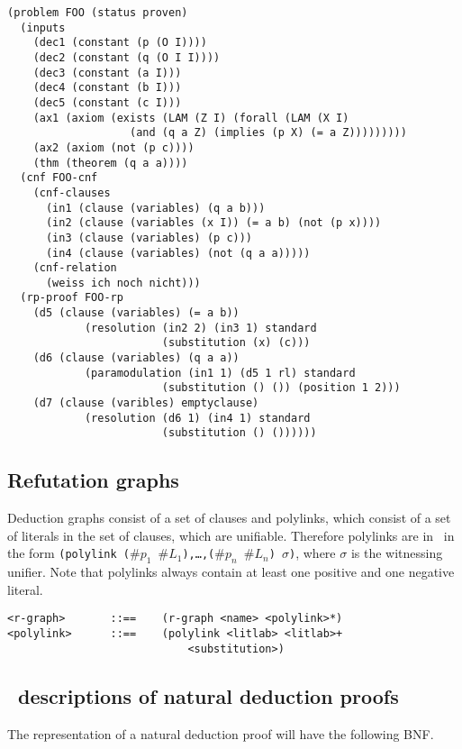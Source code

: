 \begin{verbatim}
(problem FOO (status proven)
  (inputs
    (dec1 (constant (p (O I))))
    (dec2 (constant (q (O I I)))) 
    (dec3 (constant (a I)))
    (dec4 (constant (b I)))
    (dec5 (constant (c I)))
    (ax1 (axiom (exists (LAM (Z I) (forall (LAM (X I) 
                   (and (q a Z) (implies (p X) (= a Z)))))))))
    (ax2 (axiom (not (p c))))
    (thm (theorem (q a a))))
  (cnf FOO-cnf 
    (cnf-clauses 
      (in1 (clause (variables) (q a b)))
      (in2 (clause (variables (x I)) (= a b) (not (p x))))
      (in3 (clause (variables) (p c)))
      (in4 (clause (variables) (not (q a a)))))
    (cnf-relation
      (weiss ich noch nicht)))
  (rp-proof FOO-rp
    (d5 (clause (variables) (= a b)) 
            (resolution (in2 2) (in3 1) standard
                        (substitution (x) (c)))
    (d6 (clause (variables) (q a a))  
            (paramodulation (in1 1) (d5 1 rl) standard
                        (substitution () ()) (position 1 2)))
    (d7 (clause (varibles) emptyclause) 
            (resolution (d6 1) (in4 1) standard
                        (substitution () ())))))
\end{verbatim}

\subsection{Refutation graphs}
Deduction graphs consist of a set of clauses and polylinks, which consist of a set of literals in the set of
clauses, which are unifiable. Therefore polylinks are in \post\ in the form 
{\tt (polylink ($\#p_1$ $\#L_1$),\ldots,($\#p_n$ $\#L_n$) $\sigma$)}, where $\sigma$ is the witnessing unifier.
Note that polylinks always contain at least one positive and one negative literal.\par

\begin{verbatim}
<r-graph>       ::==    (r-graph <name> <polylink>*)
<polylink>      ::==    (polylink <litlab> <litlab>+
                            <substitution>)
\end{verbatim}

\subsection{\post\ descriptions of natural deduction proofs}

The representation of a natural deduction proof will have the following
BNF.

